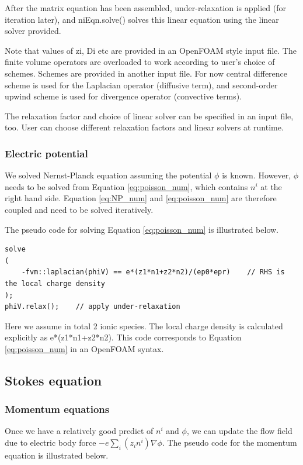 After the matrix equation has been assembled, under-relaxation is applied (for iteration later), and \textsf{niEqn.solve()} solves this linear equation using the linear solver provided. 

Note that values of \textsf{zi}, \textsf{Di} etc are provided in an OpenFOAM style input file. The finite volume operators are overloaded to work according to user's choice of schemes. Schemes are provided in another input file. For now central difference scheme is used for the Laplacian operator (diffusive term), and second-order upwind scheme is used for divergence operator (convective terms).

The relaxation factor and choice of linear solver can be specified in an input file, too. User can choose different relaxation factors and linear solvers at runtime.

\subsubsection{Electric potential}
We solved Nernst-Planck equation assuming the potential $\phi$ is known. However, $\phi$ needs to be solved from Equation \ref{eq:poisson_num}, which contains $n^i$ at the right hand side. Equation \ref{eq:NP_num} and \ref{eq:poisson_num} are therefore coupled and need to be solved iteratively.

The pseudo code for solving Equation \ref{eq:poisson_num} is illustrated below.

\begin{lstlisting}
solve
(
    -fvm::laplacian(phiV) == e*(z1*n1+z2*n2)/(ep0*epr)    // RHS is the local charge density
);
phiV.relax();    // apply under-relaxation
\end{lstlisting}

Here we assume in total 2 ionic species. The local charge density is calculated explicitly as \textsf{e*(z1*n1+z2*n2)}. This code corresponds to Equation \ref{eq:poisson_num} in an OpenFOAM syntax.


\subsection{Stokes equation}
\subsubsection{Momentum equations}
Once we have a relatively good predict of $n^i$ and $\phi$, we can update the flow field due to electric body force $-e\sum_i(z_in^i)\nabla\phi$. The pseudo code for the momentum equation is illustrated below.

